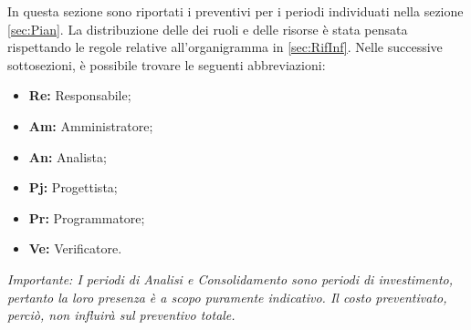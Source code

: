In questa sezione sono riportati i preventivi per i periodi individuati nella sezione \cref{sec:Pian}. \newline
La distribuzione delle dei ruoli e delle risorse è stata pensata rispettando le regole relative all'organigramma in \cref{sec:RifInf}.\newline
Nelle successive sottosezioni, è possibile trovare le seguenti abbreviazioni:
\begin{itemize}
	\item \textbf{Re: }Responsabile;
	\item \textbf{Am: }Amministratore;
	\item \textbf{An: }Analista;
	\item \textbf{Pj: }Progettista;
	\item \textbf{Pr: }Programmatore;
	\item \textbf{Ve: }Verificatore.
\end{itemize}

\bigskip
\bigskip
\emph{Importante: I periodi di Analisi e Consolidamento sono periodi di investimento, pertanto la loro presenza è a scopo puramente indicativo. Il costo preventivato, perciò, non influirà sul preventivo totale.}\newline